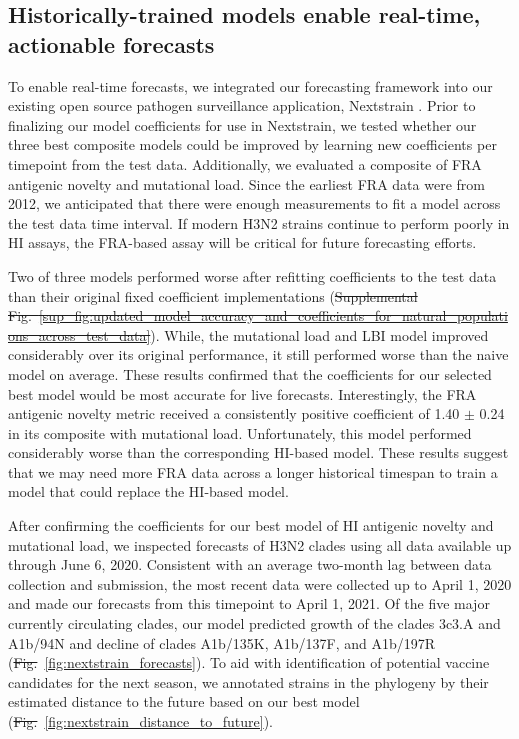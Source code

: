 \documentclass[9pt,lineno]{elife} %
\providecommand{\DIFadd}[1]{{\protect\color{blue}\uwave{#1}}} %
\providecommand{\DIFdel}[1]{{\protect\color{red}\sout{#1}}}                      %
\providecommand{\DIFaddbegin}{} %
\providecommand{\DIFaddend}{} %
\providecommand{\DIFdelbegin}{} %
\providecommand{\DIFdelend}{} %
\providecommand{\DIFaddtex}[1]{{\protect\color{blue}\uwave{#1}}} %
\providecommand{\DIFdeltex}[1]{{\protect\color{red}\sout{#1}}}                      %
\providecommand{\DIFaddbegin}{} %
\providecommand{\DIFaddend}{} %
\providecommand{\DIFdelbegin}{} %
\providecommand{\DIFdelend}{} %
\providecommand{\DIFadd}[1]{\texorpdfstring{\DIFaddtex{#1}}{#1}} %
\providecommand{\DIFdel}[1]{\texorpdfstring{\DIFdeltex{#1}}{}} %
\newcommand{\DIFscaledelfig}{0.5}
\newlength{\DIFdelgraphicswidth} %
\newlength{\DIFdelgraphicsheight} %
\newcommand{\DIFaddincludegraphics}[2][]{{\color{blue}\fbox{\DIFOincludegraphics[#1]{#2}}}} %
\newcommand{\DIFdelincludegraphics}[2][]{%
\sbox{\DIFdelgraphicsbox}{\DIFOincludegraphics[#1]{#2}}%
\settoboxwidth{\DIFdelgraphicswidth}{\DIFdelgraphicsbox} %
\settoboxtotalheight{\DIFdelgraphicsheight}{\DIFdelgraphicsbox} %
\scalebox{\DIFscaledelfig}{%
\parbox[b]{\DIFdelgraphicswidth}{\usebox{\DIFdelgraphicsbox}\\[-\baselineskip] \rule{\DIFdelgraphicswidth}{0em}}\llap{\resizebox{\DIFdelgraphicswidth}{\DIFdelgraphicsheight}{%
\setlength{\unitlength}{\DIFdelgraphicswidth}%
\begin{picture}(1,1)%
\thicklines\linethickness{2pt} %
{\color[rgb]{1,0,0}\put(0,0){\framebox(1,1){}}}%
{\color[rgb]{1,0,0}\put(0,0){\line( 1,1){1}}}%
{\color[rgb]{1,0,0}\put(0,1){\line(1,-1){1}}}%
\end{picture}%
}\hspace*{3pt}}} %
} %
\DeclareRobustCommand{\DIFaddbegin}{\DIFOaddbegin \let\includegraphics\DIFaddincludegraphics} %
\DeclareRobustCommand{\DIFaddend}{\DIFOaddend \let\includegraphics\DIFOincludegraphics} %
\DeclareRobustCommand{\DIFdelbegin}{\DIFOdelbegin \let\includegraphics\DIFdelincludegraphics} %
\DeclareRobustCommand{\DIFdelend}{\DIFOaddend \let\includegraphics\DIFOincludegraphics} %
\begin{document}
\subsection*{Historically-trained models enable real-time, actionable forecasts}

To enable real-time forecasts, we integrated our forecasting framework into our existing open source pathogen surveillance application, Nextstrain \DIFdelbegin %
\DIFdelend \DIFaddbegin \citep{Hadfield2018}\DIFaddend .
Prior to finalizing our model coefficients for use in Nextstrain, we tested whether our three best composite models could be improved by learning new coefficients per timepoint from the test data.
Additionally, we evaluated a composite of FRA antigenic novelty and mutational load.
Since the earliest FRA data were from 2012, we anticipated that there were enough measurements to fit a model across the test data time interval.
If modern H3N2 strains continue to perform poorly in HI assays, the FRA-based assay will be critical for future forecasting efforts.

Two of three models performed worse after refitting coefficients to the test data than their original fixed coefficient implementations (\DIFdelbegin \DIFdel{Supplemental Fig.~\ref{sup_fig:updated_model_accuracy_and_coefficients_for_natural_populations_across_test_data}}\DIFdelend \DIFaddbegin \DIFadd{Figure~\ref{fig:unadjusted_composite_model_accuracy_and_coefficients_for_natural_populations}-Figure supplement~\ref{figsupp:updated_model_accuracy_and_coefficients_for_natural_populations_across_test_data}}\DIFaddend ).
While, the mutational load and LBI model improved considerably over its original performance, it still performed worse than the naive model on average.
These results confirmed that the coefficients for our selected best model would be most accurate for live forecasts.
Interestingly, the FRA antigenic novelty metric received a consistently positive coefficient of 1.40 $\pm$ 0.24 in its composite with mutational load.
Unfortunately, this model performed considerably worse than the corresponding HI-based model.
These results suggest that we may need more FRA data across a longer historical timespan to train a model that could replace the HI-based model.

After confirming the coefficients for our best model of HI antigenic novelty and mutational load, we inspected forecasts of H3N2 clades using all data available up through June 6, 2020.
Consistent with an average two-month lag between data collection and submission, the most recent data were collected up to April 1, 2020 and made our forecasts from this timepoint to April 1, 2021.
Of the five major currently circulating clades, our model predicted growth of the clades 3c3.A and A1b/94N and decline of clades A1b/135K, A1b/137F, and A1b/197R (\DIFdelbegin \DIFdel{Fig.}\DIFdelend \DIFaddbegin \DIFadd{Figure}\DIFaddend ~\ref{fig:nextstrain_forecasts}).
To aid with identification of potential vaccine candidates for the next season, we annotated strains in the phylogeny by their estimated distance to the future based on our best model (\DIFdelbegin \DIFdel{Fig.}\DIFdelend \DIFaddbegin \DIFadd{Figure}\DIFaddend ~\ref{fig:nextstrain_distance_to_future}).
\end{document}
